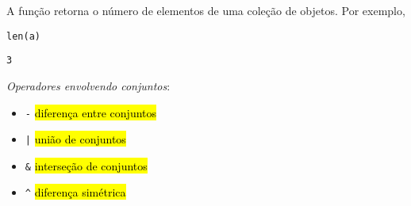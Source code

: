 \begin{obs}
  A função {\PYTHONlen} retorna o número de elementos de uma coleção de objetos. Por exemplo,
  
\begin{lstlisting}
len(a)
\end{lstlisting}

\begin{verbatim}
3
\end{verbatim}

\end{obs}

\emph{Operadores envolvendo conjuntos}:
\begin{itemize}
\item[] \texttt{-} \hl{diferença entre conjuntos}
\item[] \texttt{|} \hl{união de conjuntos}
\item[] \texttt{\&} \hl{interseção de conjuntos}
\item[] \texttt{\^{}} \hl{diferença simétrica}
\end{itemize}

